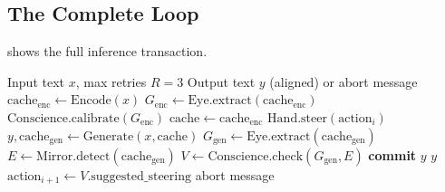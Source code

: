 \subsection{The Complete Loop}

 shows the full inference transaction.

\begin{algorithm}[H]
\caption{Oracle Loop Inference Transaction}\label{alg:oracle_loop}
\begin{algorithmic}[1]
\Require Input text $x$, max retries $R = 3$
\Ensure Output text $y$ (aligned) or abort message
\State $\text{cache}_{\text{enc}} \gets \text{Encode}(x)$
\State $G_{\text{enc}} \gets \text{Eye.extract}(\text{cache}_{\text{enc}})$
\State $\text{Conscience.calibrate}(G_{\text{enc}})$
    \State $\text{cache} \gets \text{cache}_{\text{enc}}$
    \State $\text{Hand.steer}(\text{action}_i)$
  \EndIf
  \State $y, \text{cache}_{\text{gen}} \gets \text{Generate}(x, \text{cache})$
  \State $G_{\text{gen}} \gets \text{Eye.extract}(\text{cache}_{\text{gen}})$
  \State $E \gets \text{Mirror.detect}(\text{cache}_{\text{gen}})$
  \State $V \gets \text{Conscience.check}(G_{\text{gen}}, E)$
    \State \textbf{commit} $y$ 
    \State \Return $y$
    \State $\text{action}_{i+1} \gets V.\text{suggested\_steering}$
  \EndIf
\EndFor
\State \Return abort message 
\end{algorithmic}
\end{algorithm}
